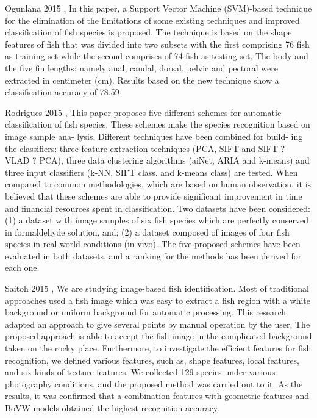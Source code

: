 Ogunlana 2015 \cite{Ogunlana2015FCU},
In this paper, a Support Vector Machine (SVM)-based technique for the elimination of the limitations of some existing techniques and improved classification of fish species is proposed. The technique is based on the shape features of fish that was divided into two subsets with the first comprising 76 fish as training set while the second comprises of 74 fish as testing set. The body and the five fin lengths; namely anal, caudal, dorsal, pelvic and pectoral were extracted in centimeter (cm). Results based on the new technique show a classification accuracy of 78.59%

Rodrigues 2015 \cite{RodriguesMarcoT.A2015Ecda},
This paper proposes five different schemes for automatic classification of fish species. These schemes make the species recognition based on image sample ana- lysis. Different techniques have been combined for build- ing the classifiers: three feature extraction techniques (PCA, SIFT and SIFT ? VLAD ? PCA), three data clustering algorithms (aiNet, ARIA and k-means) and three input classifiers (k-NN, SIFT class. and k-means class) are tested. When compared to common methodologies, which are based on human observation, it is believed that these schemes are able to provide significant improvement in time and financial resources spent in classification. Two datasets have been considered: (1) a dataset with image samples of six fish species which are perfectly conserved in formaldehyde solution, and; (2) a dataset composed of images of four fish species in real-world conditions (in vivo). The five proposed schemes have been evaluated
in both datasets, and a ranking for the methods has been derived for each one.

Saitoh 2015 \cite{Saitoh2015ImagebasedFR},
We are studying image-based fish identification. Most of traditional approaches used a fish image which was easy to extract a fish region with a white background or uniform background for automatic processing. This research adapted an approach to give several points by manual operation by the user. The proposed approach is able to accept the fish image in the complicated background taken on the rocky place. Furthermore, to investigate the efficient features for fish recognition, we defined various features, such as, shape features, local features, and six kinds of texture features. We collected 129 species under various photography conditions, and the proposed method was carried out to it. As the results, it was confirmed that a combination features with geometric features and BoVW models obtained the highest recognition accuracy.

